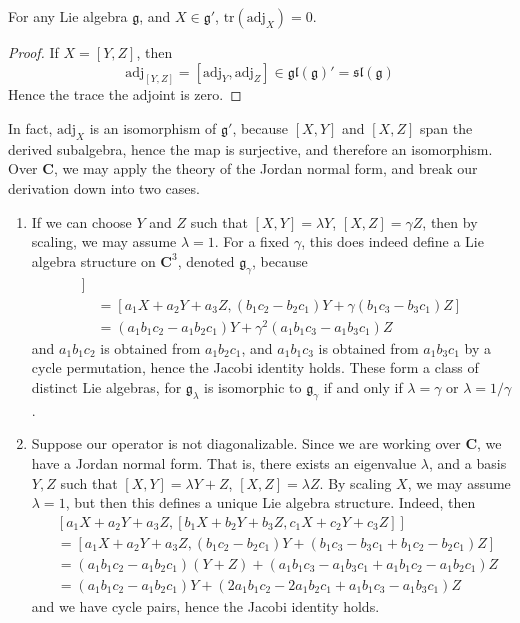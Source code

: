 \begin{lemma}
    For any Lie algebra $\mathfrak{g}$, and $X \in \mathfrak{g}'$, $\text{tr}(\text{adj}_X) = 0$.
\end{lemma}
\begin{proof}
    If $X = [Y,Z]$, then
    \[ \text{adj}_{[Y,Z]} = [\text{adj}_Y, \text{adj}_Z] \in \mathfrak{gl}(\mathfrak{g})' = \mathfrak{sl}(\mathfrak{g}) \]
    Hence the trace the adjoint is zero.
\end{proof}

In fact, $\text{adj}_X$ is an isomorphism of $\mathfrak{g}'$, because $[X,Y]$ and $[X,Z]$ span the derived subalgebra, hence the map is surjective, and therefore an isomorphism. Over $\mathbf{C}$, we may apply the theory of the Jordan normal form, and break our derivation down into two cases.

\begin{enumerate}
    \item If we can choose $Y$ and $Z$ such that $[X,Y] = \lambda Y$, $[X,Z] = \gamma Z$, then by scaling, we may assume $\lambda = 1$. For a fixed $\gamma$, this does indeed define a Lie algebra structure on $\mathbf{C}^3$, denoted $\mathfrak{g}_\gamma$, because
    \begin{align*}
        [a_1X + a_2Y& + a_3Z, [b_1X + b_2Y + b_3Z, c_1X + c_2Y + c_3Z]]\\
        &= [a_1X + a_2Y + a_3Z, (b_1c_2 - b_2c_1) Y + \gamma (b_1 c_3 - b_3c_1) Z]\\
        &= (a_1b_1c_2 - a_1 b_2c_1) Y + \gamma^2 (a_1 b_1c_3 - a_1 b_3 c_1) Z
    \end{align*}
    and $a_1b_1c_2$ is obtained from $a_1b_2c_1$, and $a_1b_1c_3$ is obtained from $a_1b_3c_1$ by a cycle permutation, hence the Jacobi identity holds. These form a class of distinct Lie algebras, for $\mathfrak{g}_\lambda$ is isomorphic to $\mathfrak{g}_\gamma$ if and only if $\lambda = \gamma$ or $\lambda = 1/\gamma$.

    \item Suppose our operator is not diagonalizable. Since we are working over $\mathbf{C}$, we have a Jordan normal form. That is, there exists an eigenvalue $\lambda$, and a basis $Y,Z$ such that $[X,Y] = \lambda Y + Z$, $[X,Z] = \lambda Z$. By scaling $X$, we may assume $\lambda = 1$, but then this defines a unique Lie algebra structure. Indeed, then
    \begin{align*}
        &[a_1X + a_2Y + a_3Z, [b_1X + b_2Y + b_3Z, c_1X + c_2Y + c_3Z]]\\
        &= [a_1X + a_2Y + a_3Z, (b_1c_2 - b_2c_1) Y + (b_1c_3 - b_3c_1 + b_1c_2 - b_2c_1) Z]\\
        &= (a_1b_1c_2 - a_1 b_2c_1) (Y + Z) + (a_1 b_1c_3 - a_1 b_3 c_1 + a_1b_1c_2 - a_1b_2c_1) Z\\
        &= (a_1b_1c_2 - a_1b_2c_1) Y + (2a_1b_1c_2 - 2a_1b_2c_1 + a_1b_1c_3 - a_1b_3c_1) Z
    \end{align*}
    and we have cycle pairs, hence the Jacobi identity holds.
\end{enumerate}


